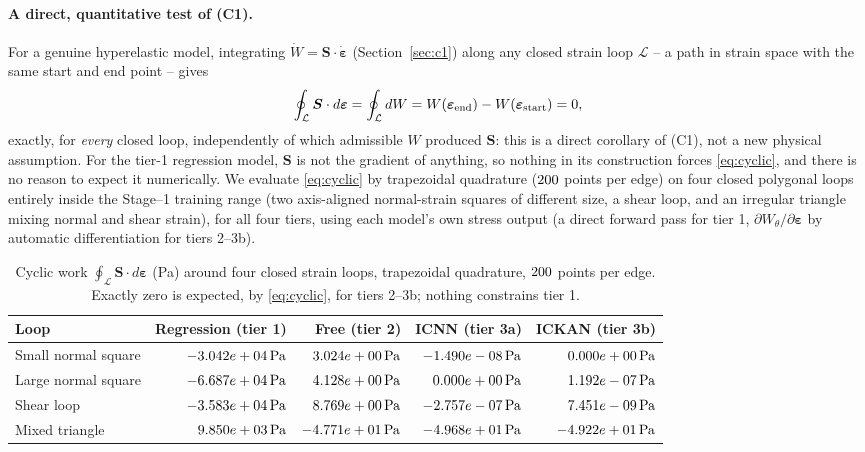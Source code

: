 \documentclass[10pt,a4paper]{article}
\begin{document}
\paragraph{A direct, quantitative test of (C1).} For a genuine hyperelastic
model, integrating $\dot W=\bm S\cdot\dot{\bm\varepsilon}$
(Section~\ref{sec:c1}) along any closed strain loop $\mathcal L$ -- a path
in strain space with the same start and end point -- gives
\begin{equation}
 \oint_{\mathcal L}\bm S\cdot d\bm\varepsilon
 =\oint_{\mathcal L}dW
 =W(\bm\varepsilon_{\rm end})-W(\bm\varepsilon_{\rm start})=0,
 \label{eq:cyclic}
\end{equation}
exactly, for \emph{every} closed loop, independently of which admissible
$W$ produced $\bm S$: this is a direct corollary of (C1), not a new
physical assumption. For the tier-1 regression model, $\bm S$ is not the
gradient of anything, so nothing in its construction forces
\eqref{eq:cyclic}, and there is no reason to expect it numerically. We
evaluate \eqref{eq:cyclic} by trapezoidal quadrature ($200{}$
points per edge) on four closed polygonal loops entirely inside the
Stage--1 training range (two axis-aligned normal-strain squares of
different size, a shear loop, and an irregular triangle mixing normal and
shear strain), for all four tiers, using each model's own stress output
(a direct forward pass for tier 1, $\partial W_\theta/\partial\bm
\varepsilon$ by automatic differentiation for tiers 2--3b).

\begin{table}[h]
\centering
\caption{Cyclic work $\oint_{\mathcal L}\bm S\cdot d\bm\varepsilon$ (Pa)
around four closed strain loops, trapezoidal quadrature,
$200{}$ points per edge. Exactly zero is expected, by
\eqref{eq:cyclic}, for tiers 2--3b; nothing constrains tier 1.}
\label{tab:cyclic}
\begin{tabular}{lrrrr}
\toprule
Loop & Regression (tier 1) & Free (tier 2) & ICNN (tier 3a) & ICKAN (tier 3b)\\
\midrule
Small normal square & $-3.042e+04\,\mathrm{Pa}$ & $3.024e+00\,\mathrm{Pa}$ & $-1.490e-08\,\mathrm{Pa}$ & $0.000e+00\,\mathrm{Pa}$\\
Large normal square & $-6.687e+04\,\mathrm{Pa}$ & $4.128e+00\,\mathrm{Pa}$ & $0.000e+00\,\mathrm{Pa}$ & $1.192e-07\,\mathrm{Pa}$\\
Shear loop & $-3.583e+04\,\mathrm{Pa}$ & $8.769e+00\,\mathrm{Pa}$ & $-2.757e-07\,\mathrm{Pa}$ & $7.451e-09\,\mathrm{Pa}$\\
Mixed triangle & $9.850e+03\,\mathrm{Pa}$ & $-4.771e+01\,\mathrm{Pa}$ & $-4.968e+01\,\mathrm{Pa}$ & $-4.922e+01\,\mathrm{Pa}$\\
\bottomrule
\end{tabular}
\end{table}
\end{document}
